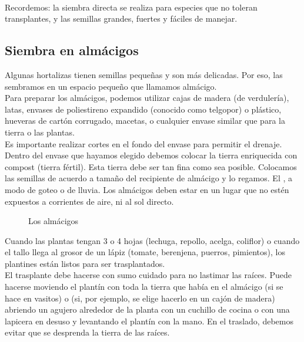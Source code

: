 \documentclass[../main.tex]{subfiles}
\begin{document}
\hfill\\

\begin{recuadroV}
    Recordemos: la siembra directa se realiza para especies que no toleran transplantes, y las semillas grandes, fuertes y fáciles de manejar.
\end{recuadroV}
 
\subsection{Siembra en almácigos}

Algunas hortalizas tienen semillas pequeñas y son más delicadas. Por eso, las sembramos en un espacio pequeño que llamamos almácigo. \\

Para preparar los almácigos, podemos utilizar cajas de madera (de verdulería), latas, envases de poliestireno expandido (conocido como telgopor) o plástico, hueveras de cartón corrugado, macetas, o cualquier envase similar que  para la tierra o las plantas. \\

Es importante realizar cortes en el fondo del envase para permitir el drenaje. Dentro del envase que hayamos elegido debemos colocar la tierra enriquecida con compost (tierra fértil). Esta tierra debe ser tan fina como sea posible. Colocamos las semillas de acuerdo a tamaño del recipiente de almácigo y lo regamos. El , a modo de goteo o de lluvia. Los almácigos deben estar en un lugar que no estén expuestos a corrientes de aire, ni al sol directo. \\


\begin{wrapfigure}[12]{o}[0cm]{0.45\textwidth}
    \centering
    \caption*{\color{CompostGreen!50!black}Los almácigos}
    \label{almacigo1}
\end{wrapfigure}

Cuando las plantas tengan 3 o 4 hojas (lechuga, repollo, acelga, coliflor) o cuando el tallo llega al grosor de un lápiz (tomate, berenjena, puerros, pimientos), los plantines están listos para ser trasplantados.\\
El trasplante debe hacerse con sumo cuidado para no lastimar las raíces. Puede hacerse moviendo el plantín con toda la tierra que había en el almácigo (si se hace en vasitos) o (si, por ejemplo, se elige hacerlo en un cajón de madera) abriendo un agujero alrededor de la planta con un cuchillo de cocina o con una lapicera en desuso y levantando el plantín con la mano. En el traslado, debemos evitar que se desprenda la tierra de las raíces. \\
\end{document}
